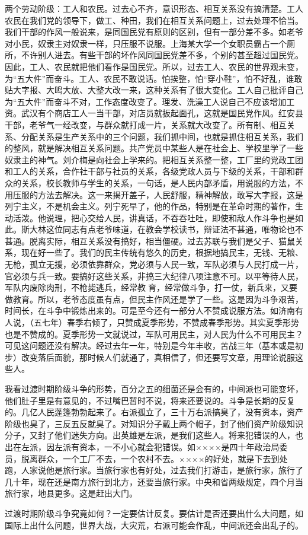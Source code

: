 两个劳动阶级：工人和农民。过去心不齐，意识形态、相互关系没有搞清楚。工人农民在我们党的领导下，做工、种田，我们在相互关系问题上，过去处理不恰当。我们干部的作风一般说来，是同国民党有原则的区别，但有一部分差不多。如老爷对小民，奴隶主对奴隶一样，只压服不说服。上海某大学一个女职员霸占一个厕所，不许别人进去。有些干部的坏作风同国民党差不多，个别的甚至超过国民党。因此，工人、农民就把他们看作是国民党。所以，过去工人、农民的世界观未变，为“五大件”而奋斗。工人、农民不敢说话。怕挨整，怕“穿小鞋”，怕不好乱，谁敢贴大字报、大鸣大放、大整大改一来，这种关系有了很大变化。工人自己批评自己为“五大件”而奋斗不对，工作态度改变了。理发、洗澡工人说自己不应该增加工资。武汉有个商店工人一当干部，对店员就扳起面孔，这就是国民党作风。红安县干部，老爷气一经改变，与群众就打成一片，关系就大改变了。所有制、相互关系、分配关系是生产关系中的三个问题，我们抓中间，也就是抓住相互关系，我们的整风，就是解决相互关系问题。共产党员中某些人是在社会上、学校里学了一些奴隶主的神气。刘介梅是向社会上学来的。把相互关系整一整，工厂里的党政工团和工人的关系，合作社干部与社员的关系，各级党政人员与下级的关系，干部和群众的关系，校长教师与学生的关系，一句话，是人民内部矛盾，用说服的方法，不用压服的方法去解决。这一来揭开盖子，人民舒服，精神解放，敢写大字报，这是列宁主义，不是机会主义。列宁死早了，他的作品，特别是在革命时期的著作，生动活泼。他说理，把心交给人民，讲真话，不吞吞吐吐，即使和敌人作斗争也是如此。斯大林这位同志有点老爷味道，在教会学校读书，辩证法不甚通，唯物论也不甚通。脱离实际，相互关系没有搞好，相当僵硬。过去苏联与我们是父子、猫鼠关系，现在好一些了。我们的民主传统有悠久的历史，根据地搞民主，无钱、无粮、无枪，孤立无援，必须依靠群众，党必须与人民一致，军队必须与人民打成一片，官必须与兵一致。要搞好这些关系，非搞三大纪律八项注意不可。以平等待人民，军队内废除肉刑，不枪毙逃兵，经常教育，经常做斗争，打一仗，新兵来，又要做教育。所以，老爷态度虽有点，但民主作风还是学了一些。这是因为斗争艰苦，时间长，在斗争中锻炼出来的。可是至今还有一部分人不赞成说服方法。如济南有人说，（五七年）春季右倾了，只赞成夏季形势，不赞成春季形势。其实夏季形势也是不赞成的。夏季形势一文就说过，军队可用民主，对人民为什么不可用民主？可见这问题还没有解决。经过去年一年，特别是今年丰收，苦战三年（基本或是初步）改变落后面貌，那时候人们就通了，真相信了，但还要写文章，用理论说服这些人。

我看过渡时期阶级斗争的形势，百分之五的细菌还是会有的，中间派也可能变坏，他们肚子里是有意见的，不过嘴巴暂时不说，将来还要说的。斗争是长期的反复的。几亿人民蓬篷勃勃起来了。右派孤立了，三十万右派搞臭了，没有资本，资产阶级也臭了，三反五反就臭了。对知识分子戴上两个帽子，封了他们资产阶级知识分子，又封了他们迷失方向。出英雄是左派，是我们这些人。将来犯错误的人，也出在左派，因左派有资本，一不小心就会犯错误。如××××是四十年政治局委员，脱离群众，一个工厂不去，一个农村不去。××××的好处，就是下去到处跑，人家说他是旅行家。当旅行家也有好处，过去我们打游击，是旅行家，旅行了几十年，现在还是南方旅行到北方，还要当旅行家。中央和省两级规定，四个月当旅行家，地县更多。这是赶出大门。

过渡时期阶级斗争究竟如何？一定要估计反复。要估计是否还要出什么大问题，如国际上出什么问题，世界大战，大灾荒，右派可能会作乱，中间派还会出乱子的。

